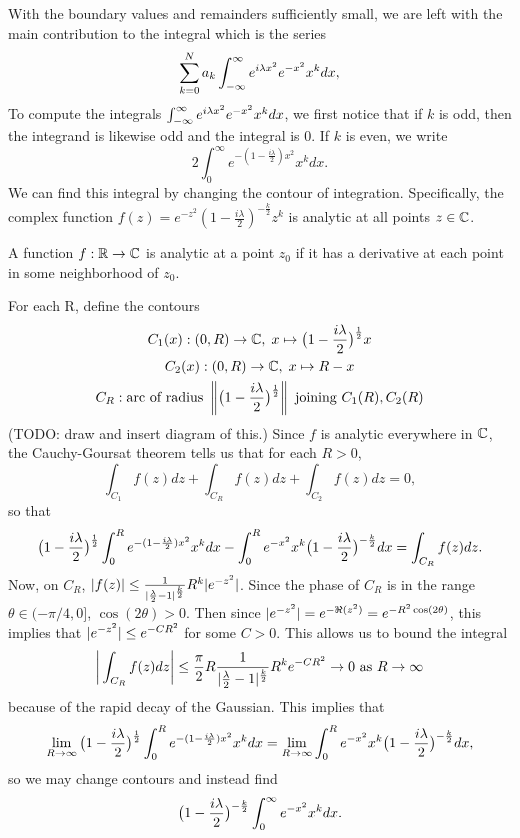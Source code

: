 With the boundary values and remainders sufficiently small, we are left with the main contribution to the integral which is the series
\[
\sum_{k=0}^Na_k \int_{-\infty}^\infty e^{i\lambda x^2} e^{-x^2} x^kdx,
\]
To compute the integrals $\int_{-\infty}^\infty e^{i\lambda x^2} e^{-x^2} x^kdx$, we first notice that if $k$ is odd, then the integrand is likewise odd and the integral is 0. If $k$ is even, we write
\[
2\int_0^\infty e^{-(1-\frac{i\lambda}{2})x^2}x^kdx.
\]
We can find this integral by changing the contour of integration. Specifically,
the complex function $f(z) = e^{-z^2}(1-\frac{i\lambda}{2})^{-\frac{k}{2}}z^k$ is analytic at all points $z \in \mathbb{C}$.
\begin{definition}
	A function $f : \mathbb{R} \to \mathbb{C}$ is analytic at a point $z_0$ if it has a derivative at each point in some neighborhood of $z_0$.
\end{definition}
For each R, define the contours
\begin{gather}
\notag C_1(x) : (0, R) \to \mathbb{C}, \; x \mapsto \big(1-\frac{i\lambda}{2}\big)^\frac{1}{2}x\\
\notag C_2(x) : (0, R) \to \mathbb{C}, \; x \mapsto R - x\\
\notag C_R : \text{arc of radius } \left\lVert\big(1-\frac{i\lambda}{2}\big)^\frac{1}{2}\right\rVert \text{ joining } C_1(R), C_2(R)
\end{gather}
(TODO: draw and insert diagram of this.)
Since $f$ is analytic everywhere in $\mathbb{C}$, the Cauchy-Goursat theorem tells us that for each $R > 0$,
\[
\int_{C_1}f(z)dz + \int_{C_R}f(z)dz + \int_{C_2}f(z)dz = 0,
\]
so that
\[
\big(1-\frac{i\lambda}{2}\big)^\frac{1}{2}\int_0^R e^{-(1-\frac{i\lambda}{2})x^2}x^kdx - \int_0^R e^{-x^2}x^k\big(1-\frac{i\lambda}{2}\big)^{-\frac{k}{2}}dx = \int_{C_R}f(z)dz.
\]
Now, on $C_R$, $\lvert f(z)\rvert \leq \frac{1}{\lvert\frac{\lambda}{2} - 1\rvert^\frac{k}{2}}R^k\lvert e^{-z^2}\rvert$. Since the phase of $C_R$ is in the range $\theta \in (-\pi/4, 0]$, $\cos(2\theta) > 0$. Then since $\lvert e^{-z^2}\rvert = e^{-\Re(z^2)} = e^{-R^2\cos(2\theta)}$, this implies that $\lvert e^{-z^2}\rvert \leq e^{-CR^2}$ for some $C > 0$.
This allows us to bound the integral
\[
\bigg\lvert\int_{C_R}f(z)dz\bigg\rvert \leq \frac{\pi}{2}R\frac{1}{\lvert\frac{\lambda}{2} - 1\rvert^\frac{k}{2}}R^ke^{-CR^2} \to 0 \text{ as } R \to \infty
\]
because of the rapid decay of the Gaussian. This implies that
\[
\lim_{R\to\infty} \big(1-\frac{i\lambda}{2}\big)^\frac{1}{2}\int_0^R e^{-(1-\frac{i\lambda}{2})x^2}x^kdx = \lim_{R\to\infty} \int_0^R e^{-x^2}x^k\big(1-\frac{i\lambda}{2}\big)^{-\frac{k}{2}}dx,
\]
so we may change contours and instead find
\[
\big(1-\frac{i\lambda}{2}\big)^{-\frac{k}{2}}\int_0^\infty e^{-x^2}x^kdx.
\]
